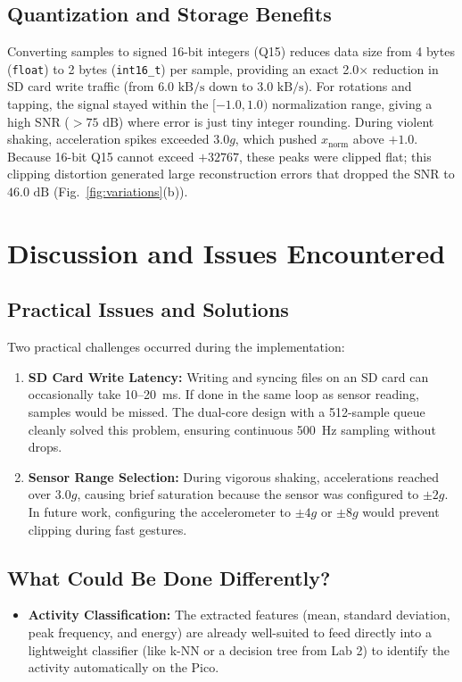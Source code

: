 \documentclass[conference]{IEEEtran}
\begin{document}
\subsection{Quantization and Storage Benefits}
Converting samples to signed 16-bit integers (Q15) reduces data size from 4 bytes (\texttt{float}) to 2 bytes (\texttt{int16\_t}) per sample, providing an exact 2.0$\times$ reduction in SD card write traffic (from $6.0\text{ kB/s}$ down to $3.0\text{ kB/s}$). For rotations and tapping, the signal stayed within the $[-1.0, 1.0)$ normalization range, giving a high SNR ($>75\text{ dB}$) where error is just tiny integer rounding. During violent shaking, acceleration spikes exceeded $3.0g$, which pushed $x_{\text{norm}}$ above $+1.0$. Because 16-bit Q15 cannot exceed $+32767$, these peaks were clipped flat; this clipping distortion generated large reconstruction errors that dropped the SNR to $46.0\text{ dB}$ (Fig.~\ref{fig:variations}(b)).

\section{Discussion and Issues Encountered}

\subsection{Practical Issues and Solutions}
Two practical challenges occurred during the implementation:
\begin{enumerate}
    \item \textbf{SD Card Write Latency:} Writing and syncing files on an SD card can occasionally take 10--20~ms. If done in the same loop as sensor reading, samples would be missed. The dual-core design with a 512-sample queue cleanly solved this problem, ensuring continuous 500~Hz sampling without drops.
    \item \textbf{Sensor Range Selection:} During vigorous shaking, accelerations reached over $3.0g$, causing brief saturation because the sensor was configured to $\pm 2g$. In future work, configuring the accelerometer to $\pm 4g$ or $\pm 8g$ would prevent clipping during fast gestures.
\end{enumerate}

\subsection{What Could Be Done Differently?}
\begin{itemize}
    \item \textbf{Activity Classification:} The extracted features (mean, standard deviation, peak frequency, and energy) are already well-suited to feed directly into a lightweight classifier (like k-NN or a decision tree from Lab 2) to identify the activity automatically on the Pico.
\end{itemize}
\end{document}
